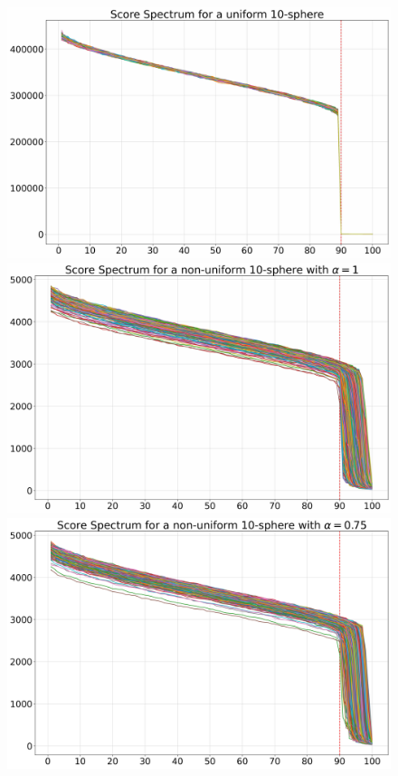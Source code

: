    \begin{figure}
    \begin{minipage}[t]{0.5\textwidth}
        \includegraphics[width=0.95\linewidth]{chapter3/figures/non_uniform/spectrum_0.jpg}
        \includegraphics[width=0.95\linewidth]{chapter3/figures/non_uniform/spectrum_1.jpg}
        \includegraphics[width=0.95\linewidth]{chapter3/figures/non_uniform/spectrum_0.75.jpg}

\end{minipage}
\end{figure}
